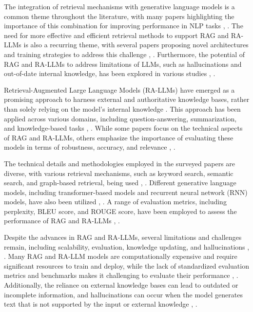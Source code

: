 \documentclass[conference]{IEEEtran}
\begin{document}
The integration of retrieval mechanisms with generative language models is a common theme throughout the literature, with many papers highlighting the importance of this combination for improving performance in NLP tasks \cite{b7}, \cite{b8}. The need for more effective and efficient retrieval methods to support RAG and RA-LLMs is also a recurring theme, with several papers proposing novel architectures and training strategies to address this challenge \cite{b9}, \cite{b10}. Furthermore, the potential of RAG and RA-LLMs to address limitations of LLMs, such as hallucinations and out-of-date internal knowledge, has been explored in various studies \cite{b11}, \cite{b12}.

Retrieval-Augmented Large Language Models (RA-LLMs) have emerged as a promising approach to harness external and authoritative knowledge bases, rather than solely relying on the model's internal knowledge \cite{b13}. This approach has been applied across various domains, including question-answering, summarization, and knowledge-based tasks \cite{b14}, \cite{b15}. While some papers focus on the technical aspects of RAG and RA-LLMs, others emphasize the importance of evaluating these models in terms of robustness, accuracy, and relevance \cite{b16}, \cite{b17}.

The technical details and methodologies employed in the surveyed papers are diverse, with various retrieval mechanisms, such as keyword search, semantic search, and graph-based retrieval, being used \cite{b18}, \cite{b19}. Different generative language models, including transformer-based models and recurrent neural network (RNN) models, have also been utilized \cite{b20}, \cite{b21}. A range of evaluation metrics, including perplexity, BLEU score, and ROUGE score, have been employed to assess the performance of RAG and RA-LLMs \cite{b22}, \cite{b23}.

Despite the advances in RAG and RA-LLMs, several limitations and challenges remain, including scalability, evaluation, knowledge updating, and hallucinations \cite{b24}, \cite{b25}. Many RAG and RA-LLM models are computationally expensive and require significant resources to train and deploy, while the lack of standardized evaluation metrics and benchmarks makes it challenging to evaluate their performance \cite{b26}, \cite{b27}. Additionally, the reliance on external knowledge bases can lead to outdated or incomplete information, and hallucinations can occur when the model generates text that is not supported by the input or external knowledge \cite{b28}, \cite{b29}.
\end{document}
